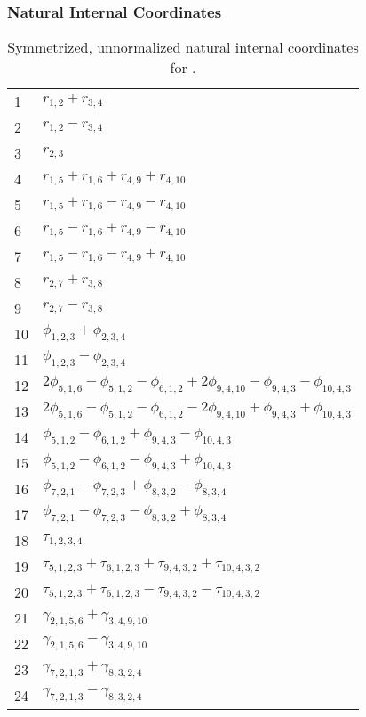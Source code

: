 \documentclass[10pt,oneside]{article}
\begin{document}
\subsubsection*{Natural Internal Coordinates}
\begin{table}[h!]
\centering
\caption{Symmetrized, unnormalized natural internal coordinates for .}
\small
\begin{tabular}{ll}
  1   & $r_{1,2} + r_{3,4}$ \\
  2   & $r_{1,2} - r_{3,4}$ \\
  3   & $r_{2,3}$ \\
  4   & $r_{1,5} + r_{1,6} + r_{4,9} + r_{4,10}$ \\
  5   & $r_{1,5} + r_{1,6} - r_{4,9} - r_{4,10}$ \\
  6   & $r_{1,5} - r_{1,6} + r_{4,9} - r_{4,10}$ \\
  7   & $r_{1,5} - r_{1,6} - r_{4,9} + r_{4,10}$ \\
  8   & $r_{2,7} + r_{3,8}$ \\
  9   & $r_{2,7} - r_{3,8}$ \\
  10  & $\phi_{1,2,3} + \phi_{2,3,4}$ \\
  11  & $\phi_{1,2,3} - \phi_{2,3,4}$ \\
  12  & $2\phi_{5,1,6} - \phi_{5,1,2} - \phi_{6,1,2} + 2\phi_{9,4,10} - \phi_{9,4,3} - \phi_{10,4,3}$ \\
  13  & $2\phi_{5,1,6} - \phi_{5,1,2} - \phi_{6,1,2} - 2\phi_{9,4,10} + \phi_{9,4,3} + \phi_{10,4,3}$ \\
  14  & $\phi_{5,1,2} - \phi_{6,1,2} + \phi_{9,4,3} - \phi_{10,4,3}$ \\
  15  & $\phi_{5,1,2} - \phi_{6,1,2} - \phi_{9,4,3} + \phi_{10,4,3}$ \\
  16  & $\phi_{7,2,1} - \phi_{7,2,3} + \phi_{8,3,2} - \phi_{8,3,4}$ \\
  17  & $\phi_{7,2,1} - \phi_{7,2,3} - \phi_{8,3,2} + \phi_{8,3,4}$ \\
  18  & $\tau_{1,2,3,4}$ \\
  19  & $\tau_{5,1,2,3} + \tau_{6,1,2,3} + \tau_{9,4,3,2} + \tau_{10,4,3,2}$ \\
  20  & $\tau_{5,1,2,3} + \tau_{6,1,2,3} - \tau_{9,4,3,2} - \tau_{10,4,3,2}$ \\
  21  & $\gamma_{2,1,5,6} + \gamma_{3,4,9,10}$ \\
  22  & $\gamma_{2,1,5,6} - \gamma_{3,4,9,10}$ \\
  23  & $\gamma_{7,2,1,3} + \gamma_{8,3,2,4}$ \\
  24  & $\gamma_{7,2,1,3} - \gamma_{8,3,2,4}$ \\
\end{tabular}
\end{table}
\end{document}
